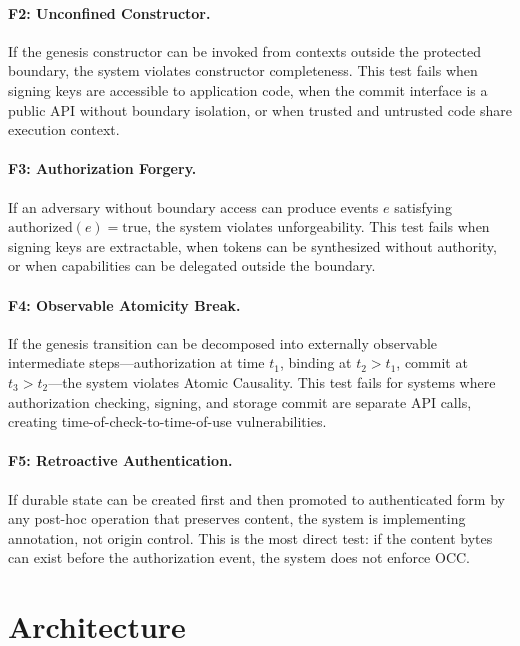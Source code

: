 \documentclass[11pt,letterpaper]{article}
\theoremstyle{occplain}
\theoremstyle{occremark}
\begin{document}
\paragraph{F2: Unconfined Constructor.}
If the genesis constructor can be invoked from contexts outside the protected boundary, the system violates constructor completeness. This test fails when signing keys are accessible to application code, when the commit interface is a public API without boundary isolation, or when trusted and untrusted code share execution context.

\paragraph{F3: Authorization Forgery.}
If an adversary without boundary access can produce events $e$ satisfying $\mathrm{authorized}(e) = \mathrm{true}$, the system violates unforgeability. This test fails when signing keys are extractable, when tokens can be synthesized without authority, or when capabilities can be delegated outside the boundary.

\paragraph{F4: Observable Atomicity Break.}
If the genesis transition can be decomposed into externally observable intermediate steps---authorization at time $t_1$, binding at $t_2 > t_1$, commit at $t_3 > t_2$---the system violates Atomic Causality. This test fails for systems where authorization checking, signing, and storage commit are separate API calls, creating time-of-check-to-time-of-use vulnerabilities.

\paragraph{F5: Retroactive Authentication.}
If durable state can be created first and then promoted to authenticated form by any post-hoc operation that preserves content, the system is implementing annotation, not origin control. This is the most direct test: if the content bytes can exist before the authorization event, the system does not enforce OCC.


\section{Architecture}
\label{sec:architecture}
\end{document}
